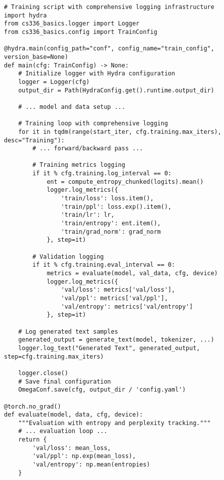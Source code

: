 \begin{lstlisting}
# Training script with comprehensive logging infrastructure
import hydra
from cs336_basics.logger import Logger
from cs336_basics.config import TrainConfig

@hydra.main(config_path="conf", config_name="train_config", version_base=None)
def main(cfg: TrainConfig) -> None:
    # Initialize logger with Hydra configuration
    logger = Logger(cfg)
    output_dir = Path(HydraConfig.get().runtime.output_dir)
    
    # ... model and data setup ...
    
    # Training loop with comprehensive logging
    for it in tqdm(range(start_iter, cfg.training.max_iters), desc="Training"):
        # ... forward/backward pass ...
        
        # Training metrics logging
        if it % cfg.training.log_interval == 0:
            ent = compute_entropy_chunked(logits).mean()
            logger.log_metrics({
                'train/loss': loss.item(), 
                'train/ppl': loss.exp().item(),
                'train/lr': lr,
                'train/entropy': ent.item(),
                'train/grad_norm': grad_norm
            }, step=it)
            
        # Validation logging
        if it % cfg.training.eval_interval == 0:
            metrics = evaluate(model, val_data, cfg, device)
            logger.log_metrics({
                'val/loss': metrics['val/loss'],
                'val/ppl': metrics['val/ppl'], 
                'val/entropy': metrics['val/entropy']
            }, step=it)
    
    # Log generated text samples
    generated_output = generate_text(model, tokenizer, ...)
    logger.log_text("Generated Text", generated_output, step=cfg.training.max_iters)
    
    logger.close()
    # Save final configuration
    OmegaConf.save(cfg, output_dir / 'config.yaml')

@torch.no_grad()
def evaluate(model, data, cfg, device):
    """Evaluation with entropy and perplexity tracking."""
    # ... evaluation loop ...
    return {
        'val/loss': mean_loss,
        'val/ppl': np.exp(mean_loss),
        'val/entropy': np.mean(entropies)
    }
\end{lstlisting}